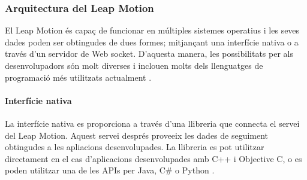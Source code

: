 \documentclass[12pt,a4paper,catalan]{article}
\begin{document}
	\subsubsection{Arquitectura del Leap Motion}
	El Leap Motion és capaç de funcionar en múltiples sistemes operatius i les seves dades poden ser obtingudes de dues formes; mitjançant una interfície nativa o a través d'un servidor de Web socket. D'aquesta manera, les possibilitats per als desenvolupadors són molt diverses i inclouen molts dels llenguatges de programació més utilitzats actualment \cite{leapsdkdocs}.
	
	\paragraph{Interfície nativa}
	La interfície nativa es proporciona a través d'una llibreria que connecta el servei del Leap Motion. Aquest servei després proveeix les dades de seguiment obtingudes a les apliacions desenvolupades. La llibreria es pot utilitzar directament en el cas d'aplicacions desenvolupades amb C++ i Objective C, o es poden utilitzar una de les APIs per Java, C\# o Python \cite{leapsdkdocs}.
	
\end{document}
